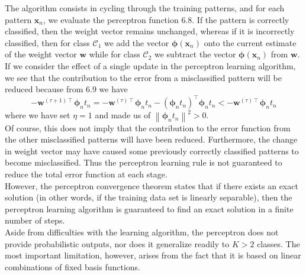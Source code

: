 \documentclass[twoside]{article}
\newcommand{\norm}[1]{\left\lVert #1 \right\rVert}
\begin{document}
The algorithm consists in cycling through the training patterns, and for each pattern $\boldsymbol{x}_n$, we evaluate the perceptron function 6.8. If the pattern is correctly classified, then the weight vector remains unchanged, whereas if it is incorrectly classified, then for class $\mathcal{C}_1$ we add the vector $\boldsymbol{\phi}(\boldsymbol{x}_n)$ onto the current estimate of the weight vector $\boldsymbol{w}$ while for class $\mathcal{C}_2$ we subtract the vector $\boldsymbol{\phi}(\boldsymbol{x}_n)$ from $\boldsymbol{w}$.\\
If we consider the effect of a single update in the perceptron learning algorithm, we see that the contribution to the error from a misclassified pattern will be reduced because from 6.9 we have
\begin{equation*}
    -\boldsymbol{w}^{(\tau + 1)\intercal}\boldsymbol{\phi}_nt_n = -\boldsymbol{w}^{(\tau)\intercal}\boldsymbol{\phi}_nt_n - (\boldsymbol{\phi}_nt_n)^\intercal\boldsymbol{\phi}_nt_n < -\boldsymbol{w}^{(\tau)\intercal}\boldsymbol{\phi}_nt_n
\end{equation*}
where we have set $\eta = 1$ and made us of $\norm{\boldsymbol{\phi}_nt_n}^2 > 0$.\\
Of course, this does not imply that the contribution to the error function from the other misclassified patterns will have been reduced. Furthermore, the change in weight vector may have caused some previously correctly classified patterns to become misclassified. Thus the perceptron learning rule is not guaranteed to reduce the total error function at each stage.\\
However, the perceptron convergence theorem states that if there exists an exact solution (in other words, if the training data set is linearly separable), then the perceptron learning algorithm is guaranteed to find an exact solution in a finite number of steps.\\
Aside from difficulties with the learning algorithm, the perceptron does not provide probabilistic outputs, nor does it generalize readily to $K > 2$ classes. The most important limitation, however, arises from the fact that it is based on linear combinations of fixed basis functions.
\end{document}
